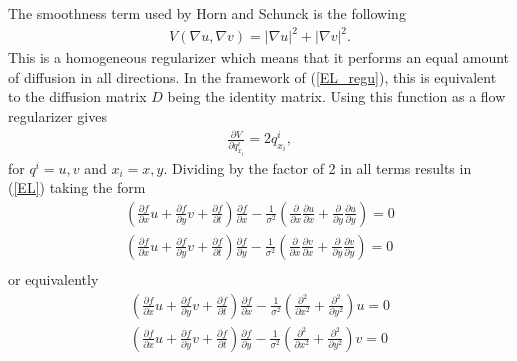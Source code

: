 \documentclass[10pt,a4paper]{article}
\begin{document}
The smoothness term used by Horn and Schunck is the following
\begin{align*}
V(\nabla u, \nabla v) = |\nabla u|^2 + |\nabla v|^2.
\end{align*}
This is a homogeneous regularizer which means that it performs an equal amount of diffusion in all directions. In the framework of (\ref{EL_regu}), this is equivalent to the diffusion matrix $D$ being the identity matrix. Using this function as a flow regularizer gives
\begin{align*}
\frac{\partial V}{\partial q^i_{x_i}} = 2q^i_{x_i},
\end{align*}
for $q^i = u,v$ and $x_i = x, y$. Dividing by the factor of 2 in all terms results in (\ref{EL}) taking the form 
\begin{equation}
\label{EL_HS}
\begin{aligned}
(\frac{\partial f}{\partial x}u + \frac{\partial f}{\partial y}v + \frac{\partial f}{\partial t}) \frac{\partial f}{\partial x} - \frac{1}{\sigma^2}(\frac{\partial}{\partial x} \frac{\partial u}{\partial x} + \frac{\partial}{\partial y} \frac{\partial u}{\partial y} ) = 0 \\
(\frac{\partial f}{\partial x}u + \frac{\partial f}{\partial y}v + \frac{\partial f}{\partial t}) \frac{\partial f}{\partial y} - \frac{1}{\sigma^2}(\frac{\partial}{\partial x} \frac{\partial v}{\partial x} + \frac{\partial}{\partial y} \frac{\partial v}{\partial y} ) = 0 \\
\end{aligned}
\end{equation}
or equivalently
\begin{align*}
(\frac{\partial f}{\partial x}u + \frac{\partial f}{\partial y}v + \frac{\partial f}{\partial t}) \frac{\partial f}{\partial x} - \frac{1}{\sigma^2}(\frac{\partial^2}{\partial x^2} +  \frac{\partial^2}{\partial y^2} ) u = 0 \\
(\frac{\partial f}{\partial x}u + \frac{\partial f}{\partial y}v + \frac{\partial f}{\partial t}) \frac{\partial f}{\partial y} - \frac{1}{\sigma^2}(\frac{\partial^2}{\partial x^2} +  \frac{\partial^2}{\partial y^2}) v = 0 \\
\end{align*}
\end{document}
